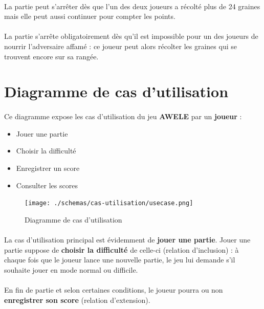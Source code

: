 \documentclass{article}
\begin{document}
    \paragraph{}
    La partie peut s'arrêter dès que l'un des deux joueurs a récolté plus de 24 graines mais elle peut aussi continuer pour compter les points.
    
    \paragraph{}
    La partie s'arrête obligatoirement dès qu'il est impossible pour un des joueurs de nourrir l'adversaire affamé : ce joueur peut alors récolter les graines qui se trouvent encore sur sa rangée.


    \newpage
    \section{Diagramme de cas d'utilisation}

    \paragraph{}
    Ce diagramme expose les cas d'utilisation du jeu \textbf{AWELE} par un \textbf{joueur} :
    \begin{itemize}
        \item Jouer une partie
        \item Choisir la difficulté
        \item Enregistrer un score
        \item Consulter les scores
    \end{itemize}

    \begin{figure}[H]
        \centering
        \texttt{[image: ./schemas/cas-utilisation/usecase.png]}
        \caption{Diagramme de cas d'utilisation}
    \end{figure}

    \paragraph{}
    La cas d'utilisation principal est évidemment de \textbf{jouer une partie}. Jouer une partie suppose de \textbf{choisir la difficulté} de celle-ci (relation d'inclusion) : à chaque fois que le joueur lance une nouvelle partie, le jeu lui demande s'il souhaite jouer en mode normal ou difficile.

    \paragraph{}
    En fin de partie et selon certaines conditions, le  joueur pourra ou non \textbf{enregistrer son score} (relation d'extension).
\end{document}
